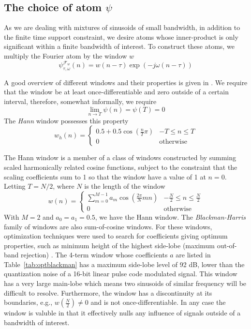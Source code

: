 \subsection{The choice of atom $\psi$ \label{sec:optblackman}}

As we are dealing with mixtures of sinusoids of small bandwidth, in addition to
the finite time support constraint, we desire atoms whose inner-product is only
significant within a finite bandwidth of interest. To construct these atoms, we
multiply the Fourier atom by the window $w$
\[
    \psi_{\tau,\omega}^{\mathcal{F}_{w}}(n) = w(n-\tau) \exp(-j\omega(n-\tau))
\]

A good overview of different windows and their properties is given in
\cite{harris1978use}. We require that the window be at least
once-differentiable and zero outside of a certain interval, therefore, somewhat
informally, we require
\[
    \lim_{n \rightarrow T} \psi(n) = \psi(T) = 0
\]
The \textit{Hann} window possesses this property
\[
    w_{h}(n) = \begin{cases}
        0.5 + 0.5 \cos \left( \frac{n}{T}\pi \right) & -T \leq n \leq T \\
        0 & \text{otherwise}
    \end{cases}
\]

The Hann window is a member of a class of windows constructed by summing scaled
harmonically related cosine functions, subject to the constraint that the
scaling coefficients sum to 1 so that the window have a value of 1 at $n=0$.
Letting $T=N/2$, where $N$ is the length of the window
\[
    w(n) = \begin{cases}
        \sum_{m=0}^{M-1}a_{m}\cos \left( \frac{2\pi}{N}mn \right) & -\frac{N}{2} \leq n
        \leq \frac{N}{2} \\
        0 & \text{otherwise}
    \end{cases}
\]
With $M=2$ and $a_0 = a_1 = 0.5$, we have the Hann window. The
\textit{Blackman-Harris} family of windows are also sum-of-cosine windows. For
these windows, optimization techniques were used to search for coefficients
giving optimum properties, such as minimum height of the highest side-lobe
(maximum out-of-band rejection) \cite{rabiner1970approach}. The 4-term window
whose coefficients $a$ are listed in Table~\ref{tab:optblackman} has a maximum
side-lobe level of 92 dB, lower than the quantization noise of a 16-bit linear
pulse code modulated signal. This window has a very large main-lobe which means
two sinusoids of similar frequency will be difficult to resolve. Furthermore,
the window has a discontinuity at its boundaries, e.g.,
$w \left( \frac{N}{2} \right) \neq 0$ and is not once-differentiable. In any
case the window is valuble in that it effectively nulls any influence of signals
outside of a bandwidth of interest.

